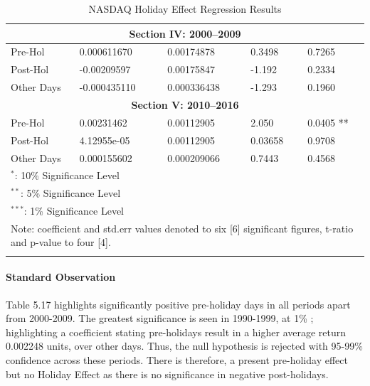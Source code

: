 \documentclass[11pt, english]{article}
\begin{document}
\begin{center}
\begin{longtable}{p{2cm}p{2cm}p{2cm}p{2cm}p{2cm}}
                \hline 
                \multicolumn{5}{c}{\textbf{Section IV: 2000--2009}}\\
                \hline                                          
                Pre-Hol & 0.000611670 & 0.00174878 & 0.3498 & 0.7265\\
                Post-Hol & -0.00209597 & 0.00175847 & -1.192 & 0.2334\\  
                Other Days & -0.000435110 & 0.000336438 & -1.293 & 0.1960\\
                \hline 
                \multicolumn{5}{c}{\textbf{Section V: 2010--2016}}\\   
                \hline            
                Pre-Hol & 0.00231462 & 0.00112905 & 2.050 & 0.0405 **\\ 
                Post-Hol & 4.12955e-05 & 0.00112905 & 0.03658 & 0.9708\\  
                Other Days & 0.000155602 & 0.000209066 & 0.7443 & 0.4568\\
                \hline
                \multicolumn{5}{l}{$^*$: 10\% Significance Level}\\  
                \multicolumn{5}{l}{$^{**}$: 5\% Significance Level}\\ 
                \multicolumn{5}{l}{$^{***}$: 1\% Significance Level}\\
                \hline
		\multicolumn{5}{p{11.5cm}}{Note: coefficient and std.err values denoted to six [6] significant figures, t-ratio and p-value to four [4].}\\
                \hline
                \caption{NASDAQ Holiday Effect Regression Results}
        \end{longtable}
        \end{center}

			\paragraph{Standard Observation}

			Table 5.17 highlights significantly positive pre-holiday days in all periods apart from 2000-2009. The greatest significance is seen in 1990-1999, at 1\% ; highlighting a coefficient stating pre-holidays result in a higher average return 0.002248 units, over other days. Thus, the null hypothesis is rejected with 95-99\% confidence across these periods. There is therefore, a present pre-holiday effect but no Holiday Effect as there is no significance in negative post-holidays.
\end{document}
